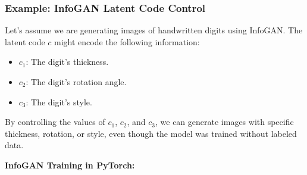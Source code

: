 \subsubsection{Example: InfoGAN Latent Code Control}
Let's assume we are generating images of handwritten digits using InfoGAN. The latent code \(c\) might encode the following information:

\begin{itemize}
    \item \(c_1\): The digit's thickness.
    \item \(c_2\): The digit's rotation angle.
    \item \(c_3\): The digit's style.
\end{itemize}

By controlling the values of \(c_1\), \(c_2\), and \(c_3\), we can generate images with specific thickness, rotation, or style, even though the model was trained without labeled data.

\textbf{InfoGAN Training in PyTorch:}


